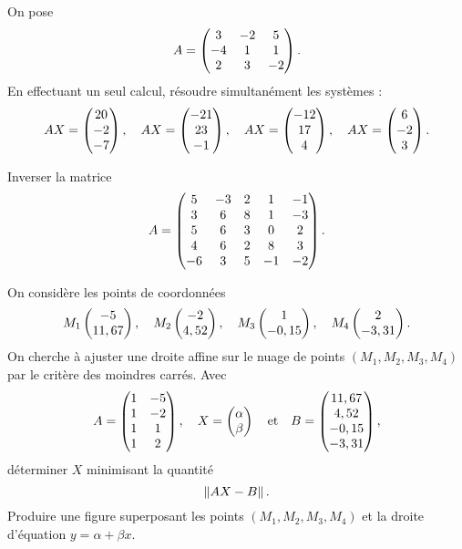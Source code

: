   On pose
  \begin{equation*}
    A = \begin{pmatrix} 3 & -2 & 5 \\ -4 & 1 & 1 \\ 2 & 3 & -2 \end{pmatrix}. 
  \end{equation*}
  En effectuant un seul calcul, résoudre simultanément les systèmes : 
  \begin{equation*}
    AX = \begin{pmatrix} 20 \\ -2 \\ -7 \end{pmatrix},\quad AX = \begin{pmatrix} -21 \\ 23 \\ -1 \end{pmatrix},\quad AX = \begin{pmatrix} -12 \\ 17 \\ 4 \end{pmatrix},\quad AX = \begin{pmatrix} 6\\-2\\3\end{pmatrix}.
  \end{equation*}

  Inverser la matrice 
  \begin{equation*}
    A = \begin{pmatrix} 5&-3&2&1&-1 \\3&6&8&1&-3 \\ 5&6&3&0&2 \\ 4&6&2&8&3 \\ -6&3&5&-1&-2 \end{pmatrix}.
  \end{equation*}

  On considère les points de coordonnées 
  \begin{equation*}
    M_1 \begin{pmatrix} -5 \\ 11,67 \end{pmatrix},\quad M_2 \begin{pmatrix} -2 \\ 4,52 \end{pmatrix},\quad M_3 \begin{pmatrix} 1\\-0,15 \end{pmatrix},\quad M_4\begin{pmatrix} 2 \\ -3,31 \end{pmatrix}.
  \end{equation*}
  On cherche à ajuster une droite affine sur le nuage de points $(M_1,M_2,M_3,M_4)$ par le critère des moindres carrés. Avec 
  \begin{equation*}
    A = \begin{pmatrix} 1 & -5 \\ 1 & -2 \\ 1 & 1 \\ 1 & 2 \end{pmatrix}, \quad X = \begin{pmatrix} \alpha \\ \beta \end{pmatrix} \quad\textrm{et} \quad B = \begin{pmatrix} 11,67 \\ 4,52 \\ -0,15 \\ -3,31 \end{pmatrix},
  \end{equation*}
  déterminer $X$ minimisant la quantité 
  \begin{equation*}
    \left\Vert {AX-B}\right\Vert. 
  \end{equation*}
  Produire une figure superposant les points $(M_1,M_2,M_3,M_4)$ et la droite d'équation $y = \alpha + \beta x $. 

